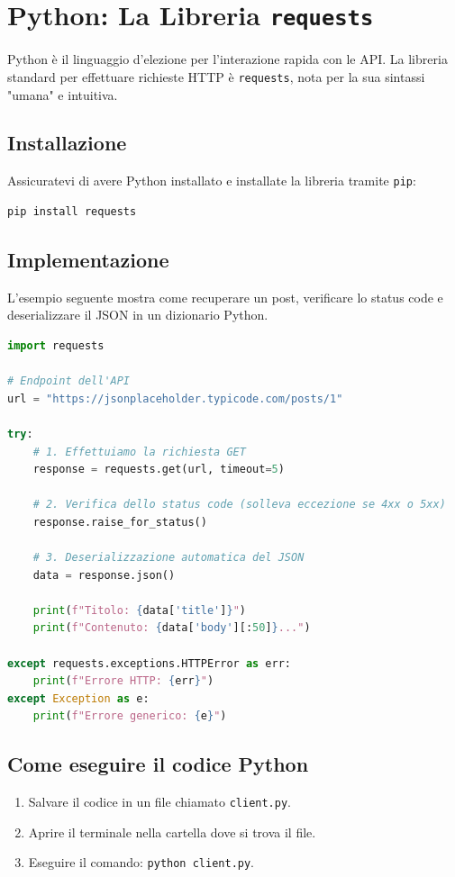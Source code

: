 \documentclass[11pt,a4paper]{report}
\begin{document}
\section{Python: La Libreria \texttt{requests}}
Python è il linguaggio d'elezione per l'interazione rapida con le API. La libreria standard per effettuare richieste HTTP è \texttt{requests}, nota per la sua sintassi "umana" e intuitiva.

\subsection{Installazione}
Assicuratevi di avere Python installato e installate la libreria tramite \texttt{pip}:
\begin{lstlisting}[language=bash]
pip install requests
\end{lstlisting}

\subsection{Implementazione}
L'esempio seguente mostra come recuperare un post, verificare lo status code e deserializzare il JSON in un dizionario Python.

\begin{lstlisting}[language=python]
import requests

# Endpoint dell'API
url = "https://jsonplaceholder.typicode.com/posts/1"

try:
    # 1. Effettuiamo la richiesta GET
    response = requests.get(url, timeout=5)
    
    # 2. Verifica dello status code (solleva eccezione se 4xx o 5xx)
    response.raise_for_status()
    
    # 3. Deserializzazione automatica del JSON
    data = response.json()
    
    print(f"Titolo: {data['title']}")
    print(f"Contenuto: {data['body'][:50]}...")

except requests.exceptions.HTTPError as err:
    print(f"Errore HTTP: {err}")
except Exception as e:
    print(f"Errore generico: {e}")
\end{lstlisting}

\subsection{Come eseguire il codice Python}
\begin{enumerate}
    \item Salvare il codice in un file chiamato \texttt{client.py}.
    \item Aprire il terminale nella cartella dove si trova il file.
    \item Eseguire il comando: \texttt{python client.py}.
\end{enumerate}
\end{document}
